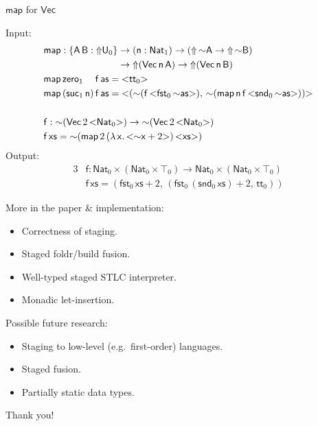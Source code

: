 \documentclass[dvipsnames,aspectratio=169]{beamer}
\newcommand{\msf}[1]{\mathsf{#1}}
\newcommand{\Lift}{{\Uparrow}}
\newcommand{\spl}{{\sim}}
\newcommand{\qut}[1]{{<}#1{>}}
\newcommand{\U}{\msf{U}}
\newcommand{\Nat}{\msf{Nat}}
\newcommand{\zero}{\msf{zero}}
\newcommand{\suc}{\msf{suc}}
\renewcommand{\tt}{\msf{tt}}
\newcommand{\fst}{\msf{fst}}
\newcommand{\snd}{\msf{snd}}
\theoremstyle{remark}
\newcommand{\Vect}{\msf{Vec}}
\newcommand{\msA}{\msf{A}}
\newcommand{\msB}{\msf{B}}
\newcommand{\msx}{\msf{x}}
\newcommand{\msas}{\msf{as}}
\newcommand{\msxs}{\msf{xs}}
\newcommand{\msff}{\msf{f}}
\newcommand{\msn}{\msf{n}}
\begin{document}
\begin{frame}{$\msf{map}$ for $\Vect$}

Input:
\begin{alignat*}{3}
  &\msf{map} : \{\msA\,\msB : \Lift \U_0\} \to
  (\msn : \Nat_1) \to (\Lift\,\spl\msA \to \Lift\,\spl\msB) \\
  & \hspace{7.7em} \to \Lift(\Vect\,\msn\,\msA) \to \Lift(\Vect\,\msn\,\msB)\\
  &\msf{map}\,\zero_1\hspace{1.25em}\msff\,\msas = \qut{\tt_0} \\
  &\msf{map}\,(\suc_1\,\msn)\,\msff\,\msas =
    \qut{(\spl(\msff\,\qut{\fst_0\,\spl \msas}),\,\spl(\msf{map}\,\msn\,\msff\,\qut{\snd_0\,\spl \msas}))} \\
  & \\
  & \msf{f} : \spl(\Vect\,2\,\qut{\Nat_0}) \to \spl(\Vect\,2\,\qut{\Nat_0}) \\
  & \msf{f}\,\msxs = \spl(\msf{map}\,2\,(\lambda\,\msx.\,\qut{\spl\msx + 2})\,\qut{\msxs})
\end{alignat*}
\pause
Output:
\begin{alignat*}{3}
  & \msf{f} : \Nat_0 \times (\Nat_0 \times \top_0) \to \Nat_0 \times (\Nat_0 \times \top_0) \\
  & \msf{f}\,\msxs = (\fst_0\,\msxs + 2,\,(\fst_0\,(\snd_0\,\msxs) + 2,\,\tt_0))
\end{alignat*}

\end{frame}

\begin{frame}{}

More in the paper \& implementation:
\begin{itemize}
  \item Correctness of staging.
  \item Staged foldr/build fusion.
  \item Well-typed staged STLC interpreter.
  \item Monadic let-insertion.
\end{itemize}
\vspace{1em}
\pause

Possible future research:
\begin{itemize}
  \item Staging to low-level (e.g.\ first-order) languages.
  \item Staged fusion.
  \item Partially static data types.
\end{itemize}

\end{frame}

\begin{frame}{}

\begin{center}
  \Large {Thank you!}
\end{center}

\end{frame}
\end{document}
